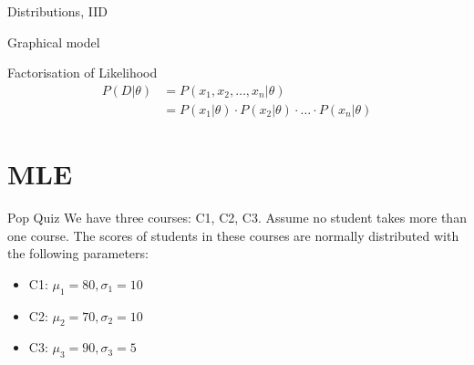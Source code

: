 \documentclass[handout]{beamer}
\begin{document}
\begin{section}{Distributions, IID}
\begin{frame}{Graphical model}
        
    \end{frame}

    \begin{frame}{Factorisation of Likelihood}
        \begin{align*}
            P(D|\theta) & = P(x_1, x_2, \ldots, x_n | \theta) \\
            & = P(x_1|\theta) \cdot P(x_2|\theta) \cdot \ldots \cdot P(x_n|\theta)
        \end{align*}
        
    \end{frame}

\end{section}

\section{MLE}
\begin{frame}{Pop Quiz}
    We have three courses: C1, C2, C3. Assume no student takes more than one course.
    The scores of students in these courses are normally distributed with the following parameters:
    \begin{itemize}
        \item C1: $\mu_1 = 80, \sigma_1 = 10$
        \item C2: $\mu_2 = 70, \sigma_2 = 10$
        \item C3: $\mu_3 = 90, \sigma_3 = 5$
    \end{itemize}


    
\end{frame}
\end{document}
